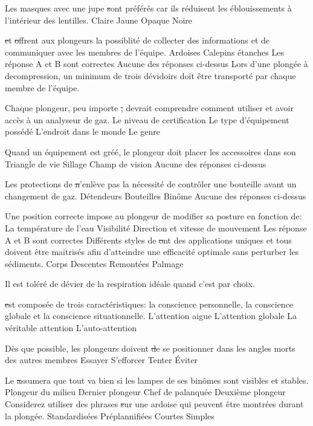\documentclass[english,10pt,twoside]{article}
\begin{document}
\begin{outline}
		\1 Les masques avec une jupe \st sont préférés car ils réduisent les éblouissements à l'intérieur des lentilles.
			\2 Claire
			\2 Jaune
			\2 Opaque
			\2 Noire

		\1 \st et \st offrent aux plongeurs la possiblité de collecter des informations et de communiquer avec les membres de l'équipe.
			\2 Ardoises
			\2 Calepins	étanches
			\2 Les réponse A et B sont correctes
			\2 Aucune des réponses ci-dessus
		\1 Lors d'une plongée à decompression, un minimum de trois dévidoirs doit être transporté par chaque membre de l'équipe.\vf

		\1 Chaque plongeur, peu importe \st, devrait comprendre comment utiliser et avoir accès à un analyseur de gaz.
			\2 Le niveau de certification
			\2 Le type d'équipement possédé
			\2 L'endroit dans le monde
			\2 Le genre

		\1 Quand un équipement est gréé, le plongeur doit placer les accessoires dans son \st
			\2 Triangle de vie
			\2 Sillage
			\2 Champ de vision
			\2 Aucune des réponses ci-dessus

		\1 Les protections de \st n'enlève pas la nécessité de contrôler une bouteille avant un changement de gaz.
			\2 Détendeurs
			\2 Bouteilles
			\2 Binôme
			\2 Aucune des réponses ci-dessus

		\1 Une position correcte impose au plongeur de modifier sa posture en fonction de:
			\2 La température de l'eau
			\2 Visibilité
			\2 Direction et vitesse de mouvement
			\2 Les réponse A et B sont correctes
		\1 Différents styles de \st ont des applications uniques et tous doivent être maitrisés afin d'atteindre une efficacité optimale sans perturber les sédiments.
			\2 Corps
			\2 Descentes
			\2 Remontées
			\2 Palmage

		\1 Il est toléré de dévier de la respiration idéale quand c'est par choix. \vf

		\1 \st est composée de trois caractéristiques: la conscience personnelle, la conscience globale et la conscience situationnelle.
			\2 L'attention aigue
			\2 L'attention globale
			\2 La véritable attention
			\2 L'auto-attention

		\1 Dès que possible, les plongeurs doivent \st de se positionner dans les angles morts des autres membres
			\2 Essayer
			\2 S'efforcer
			\2 Tenter
			\2 Éviter

		\1 Le  \st assumera que tout va bien si les lampes de ses binômes sont visibles et stables.
			\2 Plongeur du milieu
			\2 Dernier plongeur
			\2 Chef de palanquée
			\2 Deuxième plongeur
		\1 Considerez utiliser des phrases \st sur une ardoise qui peuvent être montrées durant la plongée.
			\2 Standardisées
			\2 Préplannifiées
			\2 Courtes
			\2 Simples


\end{outline}
\end{document}
